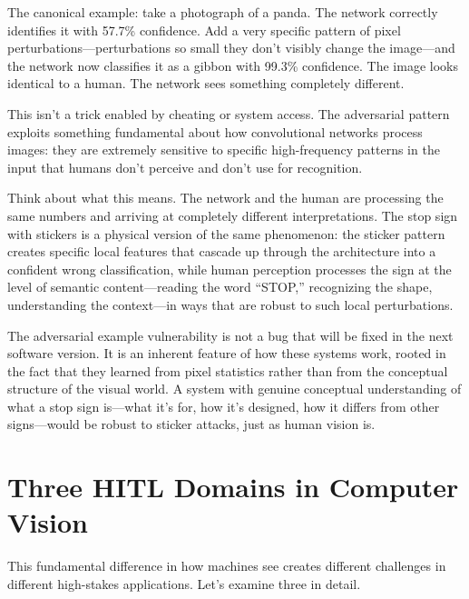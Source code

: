 The canonical example: take a photograph of a panda. The network correctly identifies it with 57.7\% confidence. Add a very specific pattern of pixel perturbations---perturbations so small they don't visibly change the image---and the network now classifies it as a gibbon with 99.3\% confidence. The image looks identical to a human. The network sees something completely different.

This isn't a trick enabled by cheating or system access. The adversarial pattern exploits something fundamental about how convolutional networks process images: they are extremely sensitive to specific high-frequency patterns in the input that humans don't perceive and don't use for recognition.

Think about what this means. The network and the human are processing the same numbers and arriving at completely different interpretations. The stop sign with stickers is a physical version of the same phenomenon: the sticker pattern creates specific local features that cascade up through the architecture into a confident wrong classification, while human perception processes the sign at the level of semantic content---reading the word ``STOP,'' recognizing the shape, understanding the context---in ways that are robust to such local perturbations.

\begin{keyconcept}
The adversarial example vulnerability is not a bug that will be fixed in the next software version. It is an inherent feature of how these systems work, rooted in the fact that they learned from pixel statistics rather than from the conceptual structure of the visual world. A system with genuine conceptual understanding of what a stop sign is---what it's for, how it's designed, how it differs from other signs---would be robust to sticker attacks, just as human vision is.
\end{keyconcept}

\section{Three HITL Domains in Computer Vision}
\label{sec:three-domains}

This fundamental difference in how machines see creates different challenges in different high-stakes applications. Let's examine three in detail.

